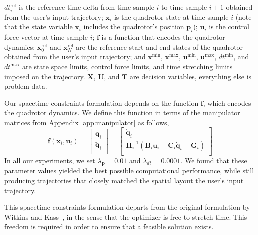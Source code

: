 $dt_i^{\text{ref}}$ is the reference time delta from time sample $i$ to time sample $i+1$ obtained from the user's input trajectory;
$\mathbf{x}_i$ is the quadrotor state at time sample $i$ (note that the state variable $\mathbf{x}_i$ includes the quadrotor's position $\mathbf{p}_i$);
$\mathbf{u}_i$ is the control force vector at time sample $i$;
$\mathbf{f}$ is a function that encodes the quadrotor dynamics;
$\mathbf{x}_0^{\text{ref}}$ and $\mathbf{x}_N^{\text{ref}}$ are the reference start and end states of the quadrotor obtained from the user's input trajectory;
and $\mathbf{x}^{\text{min}}$, $\mathbf{x}^{\text{max}}$, $\mathbf{u}^{\text{min}}$, $\mathbf{u}^{\text{max}}$, $dt^{\text{min}}$, and $dt^{\text{max}}$ are state space limits, control force limits, and time stretching limits imposed on the trajectory.
$\mathbf{X}$, $\mathbf{U}$, and $\mathbf{T}$ are decision variables, everything else is problem data.

Our spacetime constraints formulation depends on the function $\mathbf{f}$, which encodes the quadrotor dynamics.
We define this function in terms of the manipulator matrices from Appendix \ref{app:manipulator} as follows,
%
\footnotesize
\begin{equation}
\mathbf{f}(\mathbf{x}_i,\mathbf{u}_i) =
\begin{bmatrix}
\dot{\mathbf{q}}_i  \\
\ddot{\mathbf{q}}_i \\
\end{bmatrix} =
\begin{bmatrix}
\dot{\mathbf{q}}_i  \\
\mathbf{H}^{-1}_i( \mathbf{B}_i\mathbf{u}_i - \mathbf{C}_i\dot{\mathbf{q}}_i - \mathbf{G}_i) \\
\end{bmatrix}
\end{equation}
\normalsize
%
In all our experiments, we set $\lambda_\mathbf{p} = 0.01$ and $\lambda_{dt} = 0.0001$.
We found that these parameter values yielded the best possible computational performance, while still producing trajectories that closely matched the spatial layout the user's input trajectory.

This spacetime constraints formulation  departs from the original formulation by Witkins and Kass~, in the sense that the optimizer is free to stretch time.
This freedom is required in order to ensure that a feasible solution exists.

